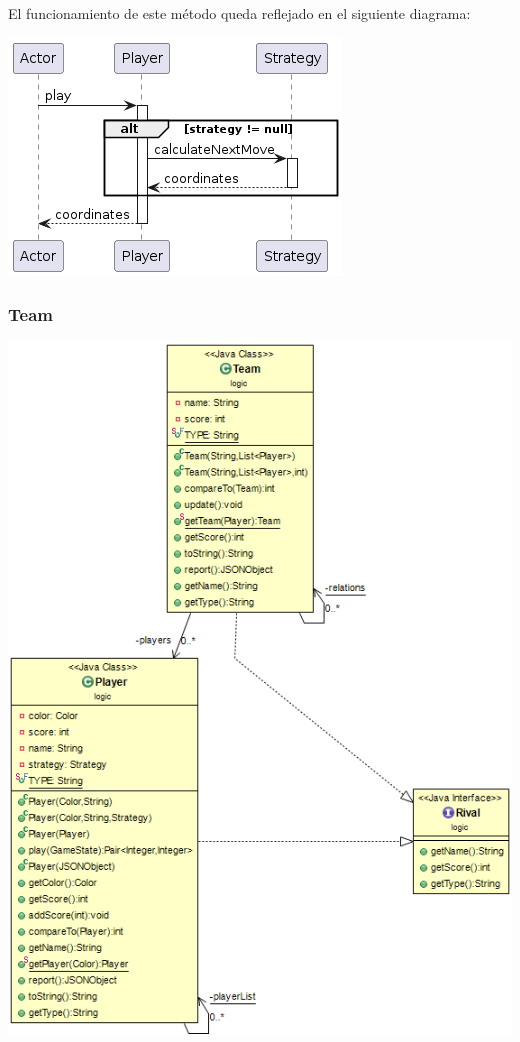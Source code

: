\documentclass[../DocumentoOficial.tex]{subfiles}
\begin{document}
El funcionamiento de este método queda reflejado en el siguiente diagrama:

\begin{center}
\includegraphics[scale=0.75]{Player.play()-sprint7.png} 
\end{center}

\subsubsection{Team}

\begin{center}
\includegraphics[scale=0.57]{Team-sprint7.png} 
\end{center}
\end{document}
